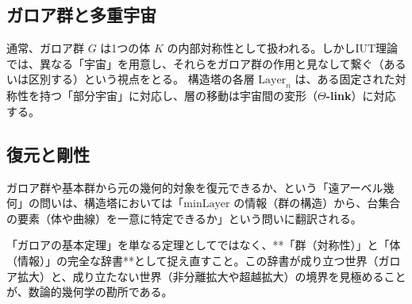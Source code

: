 \documentclass[a4paper,11pt]{ltjsarticle}
\theoremstyle{definition}
\newcommand{\Layer}[1]{\mathrm{Layer}_{#1}}
\newcommand{\MinLayer}{\mathrm{minLayer}}
\begin{document}
\subsection{ガロア群と多重宇宙}
通常、ガロア群 $G$ は1つの体 $K$ の内部対称性として扱われる。しかしIUT理論では、異なる「宇宙」を用意し、それらをガロア群の作用と見なして繋ぐ（あるいは区別する）という視点をとる。
構造塔の各層 $\Layer{n}$ は、ある固定された対称性を持つ「部分宇宙」に対応し、層の移動は宇宙間の変形（\textbf{$\Theta$-link}）に対応する。

\subsection{復元と剛性}
ガロア群や基本群から元の幾何的対象を復元できるか、という「遠アーベル幾何」の問いは、構造塔においては「$\MinLayer$ の情報（群の構造）から、台集合の要素（体や曲線）を一意に特定できるか」という問いに翻訳される。

\begin{tcolorbox}[colback=red!5!white,colframe=red!75!black,title=Group Workの視点]
「ガロアの基本定理」を単なる定理としてではなく、**「群（対称性）」と「体（情報）」の完全な辞書**として捉え直すこと。この辞書が成り立つ世界（ガロア拡大）と、成り立たない世界（非分離拡大や超越拡大）の境界を見極めることが、数論的幾何学の勘所である。
\end{tcolorbox}
\end{document}
